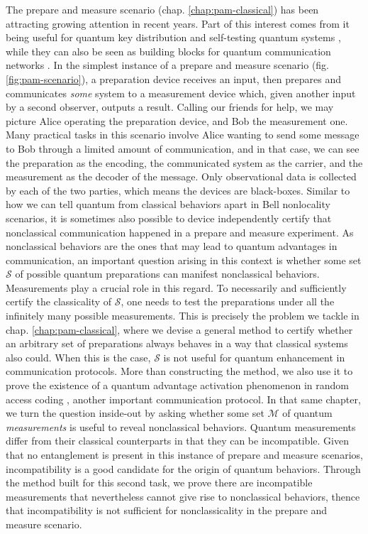 The prepare and measure scenario (chap. \ref{chap:pam-classical}) has been attracting growing attention in recent years. Part of this interest comes from it being useful for quantum key distribution \cite{pawlowski_pamqkd_2011} and self-testing quantum systems \cite{tavakoli_selftesting_2018,tavakoli_selftesting_2020}, while they can also be seen as building blocks for quantum communication networks \cite{poderini_pamcriteria_2020,bowles_pamnetworks_2015}. In the simplest instance of a prepare and measure scenario (fig. \ref{fig:pam-scenario}), a preparation device receives an input, then prepares and communicates \emph{some} system to a measurement device which, given another input by a second observer, outputs a result. Calling our friends for help, we may picture Alice operating the preparation device, and Bob the measurement one. Many practical tasks in this scenario involve Alice wanting to send some message to Bob through a limited amount of communication, and in that case, we can see the preparation as the encoding, the communicated system as the carrier, and the measurement as the decoder of the message. Only observational data is collected by each of the two parties, which means the devices are black-boxes. Similar to how we can tell quantum from classical behaviors apart in Bell nonlocality scenarios, it is sometimes also possible to device independently certify that nonclassical communication happened in a prepare and measure experiment. As nonclassical behaviors are the ones that may lead to quantum advantages in communication, an important question arising in this context is whether some set $\mathcal{S}$ of possible quantum preparations can manifest nonclassical behaviors. Measurements play a crucial role in this regard. To necessarily and sufficiently certify the classicality of $\mathcal{S}$, one needs to test the preparations under all the infinitely many possible measurements. This is precisely the problem we tackle in chap. \ref{chap:pam-classical}, where we devise a general method to certify whether an arbitrary set of preparations always behaves in a way that classical systems also could. When this is the case, $\mathcal{S}$ is not useful for quantum enhancement in communication protocols. More than constructing the method, we also use it to prove the existence of a quantum advantage activation phenomenon in random access coding \cite{ambainis_qracsoriginal_1999}, another important communication protocol. In that same chapter, we turn the question inside-out by asking whether some set $\mathcal{M}$ of quantum \emph{measurements} is useful to reveal nonclassical behaviors. Quantum measurements differ from their classical counterparts in that they can be incompatible. Given that no entanglement is present in this instance of prepare and measure scenarios, incompatibility is a good candidate for the origin of quantum behaviors. Through the method built for this second task, we prove there are incompatible measurements that nevertheless cannot give rise to nonclassical behaviors, thence that incompatibility is not sufficient for nonclassicality in the prepare and measure scenario. %